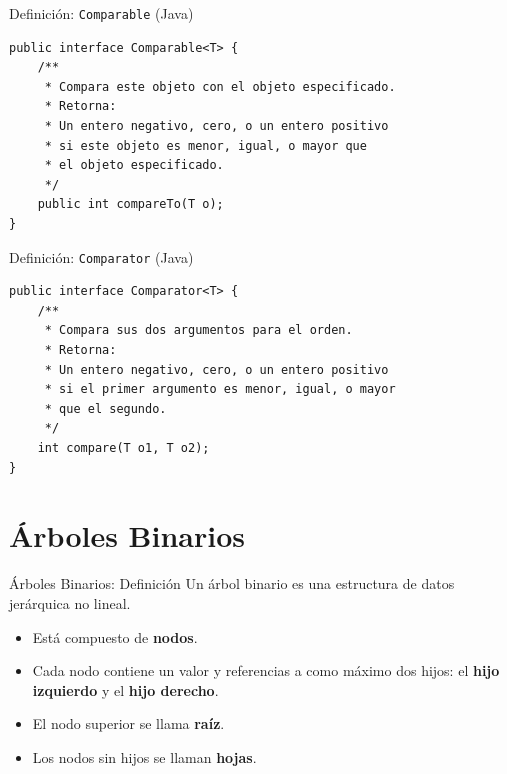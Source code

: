 \documentclass{beamer}
\begin{document}
\begin{frame}[fragile]{Definición: \texttt{Comparable} (Java)}
\begin{lstlisting}
public interface Comparable<T> {
    /**
     * Compara este objeto con el objeto especificado.
     * Retorna:
     * Un entero negativo, cero, o un entero positivo 
     * si este objeto es menor, igual, o mayor que 
     * el objeto especificado.
     */
    public int compareTo(T o);
}
\end{lstlisting}
\end{frame}

\begin{frame}[fragile]{Definición: \texttt{Comparator} (Java)}
\begin{lstlisting}
public interface Comparator<T> {
    /**
     * Compara sus dos argumentos para el orden.
     * Retorna:
     * Un entero negativo, cero, o un entero positivo
     * si el primer argumento es menor, igual, o mayor 
     * que el segundo.
     */
    int compare(T o1, T o2);
}
\end{lstlisting}
\end{frame}


\section{Árboles Binarios}

\begin{frame}[fragile]{Árboles Binarios: Definición}
  Un árbol binario es una estructura de datos jerárquica no lineal.
  \begin{itemize}
      \item Está compuesto de \textbf{nodos}.
      \item Cada nodo contiene un valor y referencias a como máximo dos hijos: el \textbf{hijo izquierdo} y el \textbf{hijo derecho}.
      \item El nodo superior se llama \textbf{raíz}.
      \item Los nodos sin hijos se llaman \textbf{hojas}.
  \end{itemize}
  \vspace{0.3cm}
  \centering
\end{frame}
\end{document}
